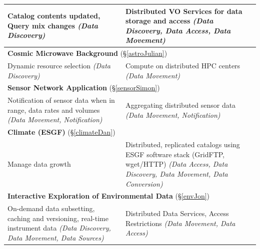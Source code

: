 \begin{table}[h]
\begin{scriptsize}
\begin{center}
\begin{tabular}{|p{6.7cm}|p{6.7cm}|}
Catalog contents updated, Query mix changes \emph{(Data Discovery)}
             &
Distributed VO Services for data storage and access \emph{(Data Discovery, Data Access, Data Movement)}
\\
		\hline
\multicolumn{2}{|l|}{{\textbf{Cosmic Microwave Background} (\S\ref{astroJulian})}} \\ \hline	
	      Dynamic resource selection  \emph{(Data Discovery)}
& Compute on distributed HPC centers \emph{(Data Movement)}
\\
		\hline
\multicolumn{2}{|l|}{{\textbf{Sensor Network Application} (\S\ref{sensorSimon})}} \\ \hline	
	     Notification of sensor data when in range, data rates and volumes \emph{(Data Movement, Notification)} %
&Aggregating distributed sensor data \emph{(Data Movement, Notification)}  \\
		\hline
\multicolumn{2}{|l|}{{\textbf{Climate (ESGF)} (\S\ref{climateDan})}} \\ \hline	
	      Manage data growth %
             &
Distributed, replicated catalogs using ESGF software stack (GridFTP, wget/HTTP) \emph{(Data Access,
  Data Discovery, Data Movement, Data Conversion)} \\
		\hline
\multicolumn{2}{|l|}{{\textbf{Interactive Exploration of Environmental Data} (\S\ref{envJon})}} \\ \hline	
On-demand data subsetting, caching and versioning, real-time instrument data \emph{(Data Discovery, Data
  Movement, Data Sources)}
		&
Distributed Data Services, Access Restrictions \emph{(Data
  Movement, Data Access)}


\end{tabular}
\end{center}
\end{scriptsize}
\end{table}
